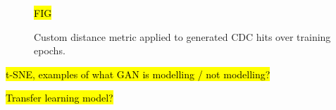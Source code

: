 \begin{figure}
    \centering
    \hl{FIG}
    \caption{Custom distance metric applied to generated CDC hits over training epochs.}
    \label{fig:custom_distance_vs_epochs}
\end{figure}


\hl{t-SNE, examples of what GAN is modelling / not modelling?}

\hl{Transfer learning model?}





